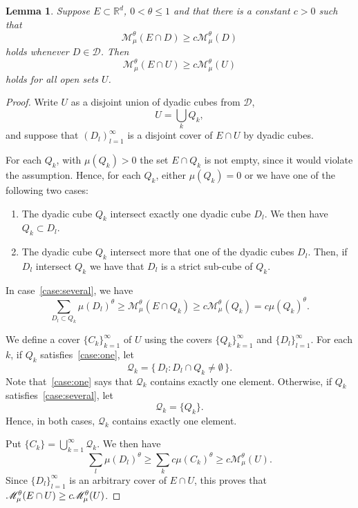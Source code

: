 \documentclass[10pt]{amsart}
\newtheorem{lemm}[theo]{Lemma}\newtheorem{prop}[theo]{Proposition}\newtheorem{coro}[theo]{Corollary}\newtheorem{conj}[theo]{Conjecture}
\theoremstyle{definition}\newtheorem{defi}[theo]{Definition}\newtheorem{rema}[theo]{Remark}\newtheorem{exam}[theo]{Example}\newtheorem{exem}[theo]{Example}\newtheorem{nota}[theo]{Notation}
\begin{document}
\begin{lemm}\label{lem:open}
Suppose $E \subset \mathbb{R}^d$, $0 < \theta \leq 1$ and that there is a constant $c > 0$ such that
\[
\mathscr{M}_\mu^\theta (E \cap D) \geq c \mathscr{M}_\mu^\theta (D)
\]
holds whenever $D \in \mathscr{D}$. Then
\[
\mathscr{M}_\mu^\theta (E \cap U) \geq c \mathscr{M}_\mu^\theta (U)
\]
holds for all open sets $U$.
\end{lemm}

\begin{proof}
Write $U$ as a disjoint union of dyadic cubes from $\mathscr{D}$,
\[
U = \bigcup_k Q_k,
\]
and suppose that $(D_l)_{l=1}^\infty$ is a disjoint cover of $E \cap U$ by dyadic cubes.

For each $Q_k$, with $\mu (Q_k) > 0$ the set $E \cap Q_k$ is not empty, since it would violate the assumption. Hence, for each $Q_k$, either $\mu (Q_k) = 0$ or we have one of the following two cases:
\begin{enumerate}
\item \label{case:one}
The dyadic cube $Q_k$ intersect exactly one dyadic cube $D_l$. We then have $Q_k \subset D_l$.
\item \label{case:several}
The dyadic cube $Q_k$ intersect more that one of the dyadic cubes $D_l$. Then, if $D_l$ intersect $Q_k$ we have that $D_l$ is a strict sub-cube of $Q_k$.
\end{enumerate}
In case~\eqref{case:several}, we have
\[
\sum_{D_l \subset Q_k} \mu (D_l)^\theta \geq \mathscr{M}_\mu^\theta (E \cap Q_k) \geq c \mathscr{M}_\mu^\theta (Q_k) = c \mu (Q_k)^\theta.
\]

We define a cover $\{C_k\}_{k=1}^\infty$ of $U$ using the covers $\{Q_k\}_{k=1}^\infty$ and $\{D_l\}_{l=1}^\infty$. For each $k$, if $Q_k$ satisfies~\eqref{case:one}, let
\[
\mathscr{Q}_k = \{\, D_l : D_l \cap Q_k \neq \emptyset \,\}.
\]
Note that~\eqref{case:one} says that $\mathscr{Q}_k$ contains exactly one element. Otherwise, if $Q_k$ satisfies~\eqref{case:several}, let
\[
\mathscr{Q}_k = \{Q_k\}.
\]
Hence, in both cases, $\mathscr{Q}_k$ contains exactly one element.

Put $\{C_k\} = \bigcup_{k=1}^\infty \mathscr{Q}_k$. We then have
\[
\sum_l \mu (D_l)^\theta \geq \sum_k c \mu (C_k)^\theta \geq c \mathscr{M}_\mu^\theta (U).
\]
Since $\{D_l\}_{l=1}^\infty$ is an arbitrary cover of $E \cap U$, this proves that $\mathscr{M}_\mu^\theta (E \cap U) \geq\linebreak c \mathscr{M}_\mu^\theta (U)$.
\end{proof}
\end{document}

